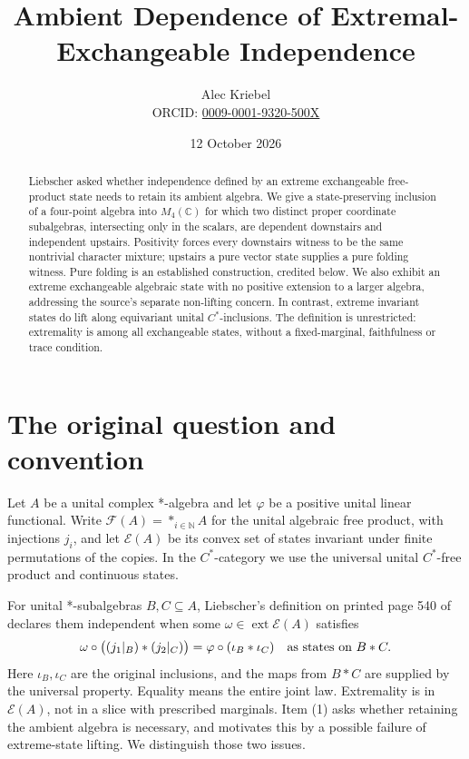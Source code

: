 \documentclass[10pt]{article}
\title{Ambient Dependence of Extremal-Exchangeable Independence}
\author{Alec Kriebel\\
  \small ORCID: \href{https://orcid.org/0009-0001-9320-500X}{0009-0001-9320-500X}}
\date{12 October 2026}
\newcommand{\C}{\mathbb C}
\newcommand{\F}{\mathcal F}
\newcommand{\E}{\mathcal E}
\begin{document}
\maketitle
\begin{abstract}
Liebscher asked whether independence defined by an extreme exchangeable
free-product state needs to retain its ambient algebra. We give a
state-preserving inclusion of a four-point algebra into \(M_4(\C)\) for
which two distinct proper coordinate subalgebras, intersecting only in
the scalars, are dependent downstairs and independent upstairs.
Positivity forces every downstairs witness to be the same nontrivial
character mixture; upstairs a pure vector state supplies a pure folding
witness. Pure folding is an established construction, credited below.
We also exhibit an extreme exchangeable algebraic state with no positive
extension to a larger algebra, addressing the source's separate
non-lifting concern. In contrast, extreme invariant states do lift
along equivariant unital \(C^*\)-inclusions. The definition is unrestricted:
extremality is among all exchangeable states, without a fixed-marginal,
faithfulness or trace condition.
\end{abstract}

\section{The original question and convention}
Let \(A\) be a unital complex *-algebra and let \(\varphi\) be a positive
unital linear functional. Write
\(\F(A)=*_{i\in\mathbb N}A\) for the unital algebraic free product,
with injections \(j_i\), and let \(\E(A)\) be its convex set of states
invariant under finite permutations of the copies. In the \(C^*\)-category
we use the universal unital \(C^*\)-free product and continuous states.

For unital *-subalgebras \(B,C\subseteq A\), Liebscher's definition
on printed page 540 of \cite{Liebscher} declares them independent
when some \(\omega\in\operatorname{ext}\E(A)\) satisfies
\begin{equation}\label{law}
 \omega\circ\bigl((j_1|_B)*(j_2|_C)\bigr)
 =\varphi\circ(\iota_B*\iota_C)
 \quad\hbox{as states on }B*C.
\end{equation}
Here \(\iota_B,\iota_C\) are the original inclusions, and the maps
from \(B*C\) are supplied by the universal property. Equality means
the entire joint law. Extremality is in \(\E(A)\), not in a slice
with prescribed marginals. Item (1) asks whether retaining the ambient
algebra is necessary, and motivates this by a possible failure of
extreme-state lifting. We distinguish those two issues.
\end{document}
